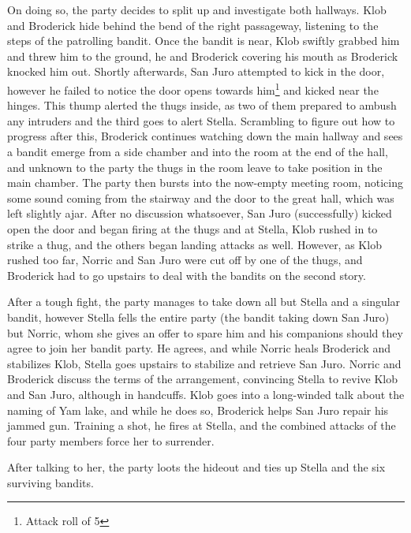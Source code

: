 On doing so, the party decides to split up and investigate both hallways. Klob and Broderick hide behind the bend of the right passageway, listening to the steps of the patrolling bandit. Once the bandit is near, Klob swiftly grabbed him and threw him to the ground, he and Broderick covering his mouth as Broderick knocked him out. Shortly afterwards, San Juro attempted to kick in the door, however he failed to notice the door opens towards him\footnote{Attack roll of 5} and kicked near the hinges. This thump alerted the thugs inside, as two of them prepared to ambush any intruders and the third goes to alert Stella. Scrambling to figure out how to progress after this, Broderick continues watching down the main hallway and sees a bandit emerge from a side chamber and into the room at the end of the hall, and unknown to the party the thugs in the room leave to take position in the main chamber. The party then bursts into the now-empty meeting room, noticing some sound coming from the stairway and the door to the great hall, which was left slightly ajar. After no discussion whatsoever, San Juro (successfully) kicked open the door and began firing at the thugs and at Stella, Klob rushed in to strike a thug, and the others began landing attacks as well. However, as Klob rushed too far, Norric and San Juro were cut off by one of the thugs, and Broderick had to go upstairs to deal with the bandits on the second story. 

After a tough fight, the party manages to take down all but Stella and a singular bandit, however Stella fells the entire party (the bandit taking down San Juro) but Norric, whom she gives an offer to spare him and his companions should they agree to join her bandit party. He agrees, and while Norric heals Broderick and stabilizes Klob, Stella goes upstairs to stabilize and retrieve San Juro. Norric and Broderick discuss the terms of the arrangement, convincing Stella to revive Klob and San Juro, although in handcuffs. Klob goes into a long-winded talk about the naming of Yam lake, and while he does so, Broderick helps San Juro repair his jammed gun. Training a shot, he fires at Stella, and the combined attacks of the four party members force her to surrender.

After talking to her, the party loots the hideout and ties up Stella and the six surviving bandits. 

